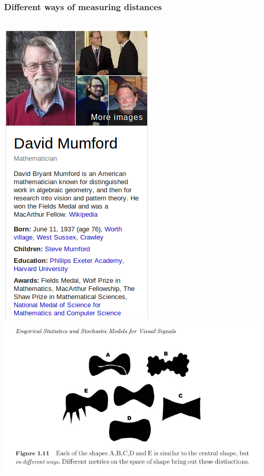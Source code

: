 \begin{frame}
\frametitle{Different ways of measuring distances}
\begin{columns}[c]
\includegraphics[width=\textwidth]{mumford}
\includegraphics[width=\textwidth]{mumford_fig}

\end{columns}
\end{frame}
